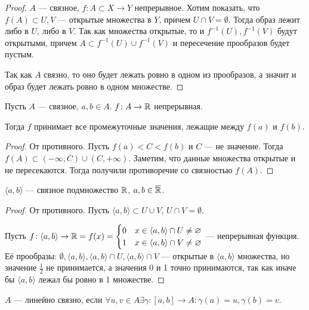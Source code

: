 \begin{proof}
    $A$ --- связное,  $f\!: A \subset X \to Y$ непрерывное. Хотим показать, что $f(A) \subset U, V$ --- открытые множества в $Y$, причем  $U \cap V = \emptyset$. Тогда образ лежит либо в $U$, либо в  $V$. Так как множества открытые, то и $f^{-1}(U), f^{-1}(V)$ будут открытыми, причем  $A \subset f^{-1}(U) \cup f^{-1}(V)$ и пересечение прообразов будет пустым.

    Так как $A$ связно, то оно будет лежать ровно в одном из прообразов, а значит и образ будет лежать ровно в одном множестве.
\end{proof}
\begin{consequence}
    Пусть $A$ --- связное, $a, b \in A$. $f\!: A \to \mathbb{R}$ непрерывная. 

    Тогда  $f$ принимает все промежуточные значения, лежащие между  $f(a)$ и  $f(b)$.
\end{consequence}
\begin{proof}
    От противного. Пусть $f(a) < C < f(b)$ и $C$ --- не значение. Тогда  $f(A) \subset (-\infty, C) \cup (C, +\infty)$. Заметим, что данные множества открытые и не пересекаются. Тогда получили противоречие со связностью  $f(A)$.
\end{proof}
\begin{theorem}
    $\langle a, b \rangle$ --- связное подмножество  $\mathbb{R}$,  $a, b \in \overline{\mathbb{R}}$.
\end{theorem}
\begin{proof}
    От противного. Пусть $\langle a, b \rangle \subset U \cup V$,  $U \cap V = \emptyset$. 

    Пусть  $f\!: \langle a, b \rangle \to \mathbb{R} = f(x) = \begin{cases} 0 & x \in \langle a, b \rangle \cap U \neq \varnothing \\ 1 & x \in \langle a, b \rangle \cap V \neq \varnothing \end{cases}$ --- непрерывная функция. Её прообразы:  $\emptyset, \langle a, b \rangle, \langle a, b \rangle \cap U, \langle a, b \rangle \cap V$ --- открытые в  $\langle a, b \rangle$ множества, но значение  $\frac{1}{2}$ не принимается, а значения 0 и 1 точно принимаются, так как иначе бы $\langle a, b \rangle$ лежал бы ровно в 1 множестве. 
\end{proof}
\begin{definition}
    $A$ --- линейно связно, если  $\forall u, v \in A \exists \gamma\!: [a, b] \to A\!: \gamma(a) = u, \gamma(b) = v$.
\end{definition}
